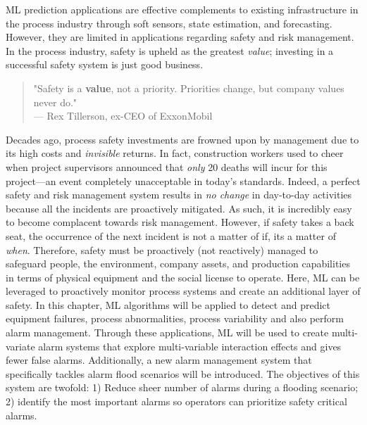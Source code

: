 %
% 

ML prediction applications are effective complements to existing infrastructure in the process industry through soft sensors, state estimation, and forecasting. However, they are limited in applications regarding safety and risk management.  In the process industry, safety is upheld as the greatest \textit{value}; investing in a successful safety system is just good business.  

\begin{quote}
    "Safety is a \textbf{value}, not a priority.  Priorities change, but company values never do." \\
    --- Rex Tillerson, ex-CEO of ExxonMobil
\end{quote}

Decades ago, process safety investments are frowned upon by management due to its high costs and \textit{invisible} returns. In fact, construction workers used to cheer when project supervisors announced that \textit{only} 20 deaths will incur for this project---an event completely unacceptable in today's standards. Indeed, a perfect safety and risk management system results in \textit{no change} in day-to-day activities because all the incidents are proactively mitigated. As such, it is incredibly easy to become complacent towards risk management. However, if safety takes a back seat, the occurrence of the next incident is not a matter of if, its a matter of \textit{when}. Therefore, safety must be proactively (not reactively) managed to safeguard people, the environment, company assets, and production capabilities in terms of physical equipment and the social license to operate. Here, ML can be leveraged to proactively monitor process systems and create an additional layer of safety. In this chapter, ML algorithms will be applied to detect and predict equipment failures, process abnormalities, process variability and also perform alarm management. Through these applications, ML will be used to create multi-variate alarm systems that explore multi-variable interaction effects and gives fewer false alarms. Additionally, a new alarm management system that specifically tackles alarm flood scenarios will be introduced.  The objectives of this system are twofold: 1) Reduce sheer number of alarms during a flooding scenario; 2) identify the most important alarms so operators can prioritize safety critical alarms.

